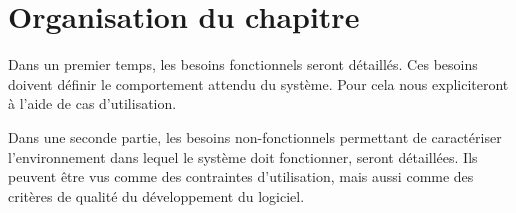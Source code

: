 	\section{Organisation du chapitre}
Dans un premier temps, les besoins fonctionnels seront détaillés. Ces besoins doivent définir le comportement attendu du système. Pour cela nous expliciteront à l'aide de cas d'utilisation.

\medskip

Dans une seconde partie, les besoins non-fonctionnels permettant de caractériser l'environnement dans lequel le système doit fonctionner, seront détaillées. Ils peuvent être vus comme des contraintes d'utilisation, mais aussi comme des critères de qualité du développement du logiciel.

